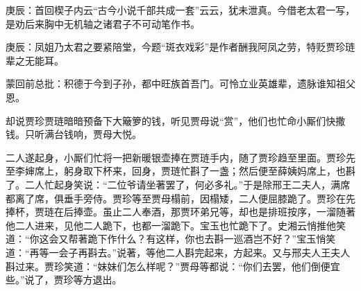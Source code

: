 \begin{parag}
    \begin{note}庚辰：首回楔子内云“古今小说千部共成一套”云云，犹未泄真。今借老太君一写，是劝后来胸中无机轴之诸君子不可动笔作书。\end{note}
\end{parag}


\begin{parag}
    \begin{note}庚辰：凤姐乃太君之要紧陪堂，今题“斑衣戏彩”是作者酬我阿凤之劳，特贬贾珍琏辈之无能耳。\end{note}
\end{parag}


\begin{parag}
    \begin{note}蒙回前总批：积德于今到子孙，都中旺族首吾门。可怜立业英雄辈，遗脉谁知祖父恩。\end{note}
\end{parag}


\begin{parag}
    却说贾珍贾琏暗暗预备下大簸箩的钱，听见贾母说“赏”，他们也忙命小厮们快撒钱。只听满台钱响，贾母大悦。
\end{parag}


\begin{parag}
    二人遂起身，小厮们忙将一把新暖银壶捧在贾琏手内，随了贾珍趋至里面。贾珍先至李婶席上，躬身取下杯来，回身，贾琏忙斟了一盏；然后便至薛姨妈席上，也斟了。二人忙起身笑说：“二位爷请坐著罢了，何必多礼。”于是除邢王二夫人，满席都离了席，俱垂手旁侍。贾珍等至贾母榻前，因榻矮，二人便屈膝跪了。贾珍在先捧杯，贾琏在后捧壶。虽止二人奉酒，那贾环弟兄等，却也是排班按序，一溜随著他二人进来，见他二人跪下，也都一溜跪下。宝玉也忙跪下了。史湘云悄推他笑道：“你这会又帮著跪下作什么？有这样，你也去斟一巡酒岂不好？”宝玉悄笑道：“再等一会子再斟去。”说著，等他二人斟完起来，方起来。又与邢夫人王夫人斟过来。贾珍笑道：“妹妹们怎么样呢？”贾母等都说：“你们去罢，他们倒便宜些。”说了，贾珍等方退出。
\end{parag}


